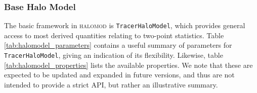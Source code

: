 \documentclass[5p]{elsarticle}
\begin{document}
\subsubsection{Base Halo Model}
\label{sec:halomod:frameworks:base}
The basic framework in \textsc{halomod} is \verb|TracerHaloModel|, which provides general access to most derived quantities relating to two-point statistics. Table \ref{tab:halomodel_parameters} contains a useful summary of parameters for \verb|TracerHaloModel|, giving an indication of its flexibility. Likewise, table \ref{tab:halomodel_properties} lists the available properties. We note that these are expected to be updated and expanded in future versions, and thus are not intended to provide a strict API, but rather an illustrative summary.


\end{document}
